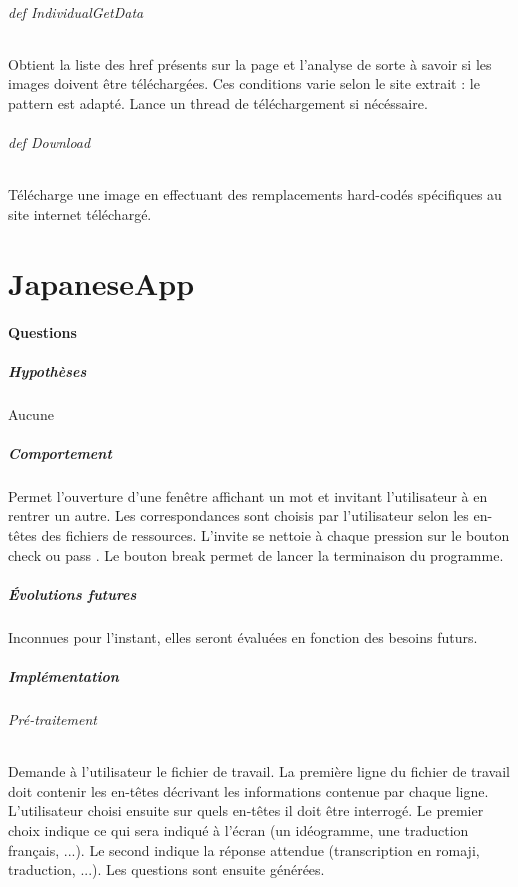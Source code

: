 \documentclass[a4paper,12pt]{article}
\begin{document}
\paragraph{def IndividualGetData}
Obtient la liste des href présents sur la page et l'analyse de sorte à savoir si les images doivent être téléchargées. Ces conditions varie selon le site extrait : le pattern est adapté. Lance un thread de téléchargement si nécéssaire. 
\paragraph{def Download}
Télécharge une image en effectuant des remplacements hard-codés spécifiques au site internet téléchargé.

\part{JapaneseApp}
\subsection{Questions}
\subsubsection{Hypothèses}
Aucune
\subsubsection{Comportement}
Permet l'ouverture d'une fenêtre affichant un mot et invitant l'utilisateur à en rentrer un autre. Les correspondances sont choisis par l'utilisateur selon les en-têtes des fichiers de ressources. L'invite se nettoie à chaque pression sur le bouton \og check \fg{} ou \og pass \fg. Le bouton \og break \fg{} permet de lancer la terminaison du programme.
\subsubsection{Évolutions futures}
Inconnues pour l'instant, elles seront évaluées en fonction des besoins futurs.
\subsubsection{Implémentation}
\paragraph{Pré-traitement}
Demande à l'utilisateur le fichier de travail. La première ligne du fichier de travail doit contenir les en-têtes décrivant les informations contenue par chaque ligne. L'utilisateur choisi ensuite sur quels en-têtes il doit être interrogé. Le premier choix indique ce qui sera indiqué à l'écran (un idéogramme, une traduction français, ...). Le second indique la réponse attendue (transcription en romaji, traduction, ...). Les questions sont ensuite générées.
\end{document}
